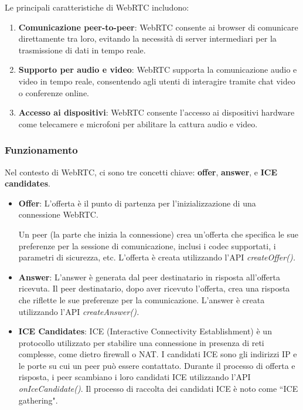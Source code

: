 Le principali caratteristiche di WebRTC includono:

\begin{enumerate}
    \item \textbf{Comunicazione peer-to-peer}: WebRTC consente ai browser di comunicare direttamente tra loro, evitando la necessità di server intermediari per la trasmissione di dati in tempo reale.

    \item \textbf{Supporto per audio e video}: WebRTC supporta la comunicazione audio e video in tempo reale, consentendo agli utenti di interagire tramite chat video o conferenze online.

    \item \textbf{Accesso ai dispositivi}: WebRTC consente l'accesso ai dispositivi hardware come telecamere e microfoni per abilitare la cattura audio e video.
\end{enumerate}

%
%
%
\subsubsection{Funzionamento}
Nel contesto di WebRTC, ci sono tre concetti chiave: \textbf{offer}, \textbf{answer}, e \textbf{ICE candidates}.

\begin{itemize}
    \item \textbf{Offer}:
    L'offerta è il punto di partenza per l'inizializzazione di una connessione WebRTC.

    Un peer (la parte che inizia la connessione) crea un'offerta che specifica le sue preferenze per la sessione di comunicazione, inclusi i codec supportati, i parametri di sicurezza, etc.
    L'offerta è creata utilizzando l'API \textit{createOffer().}

    \item \textbf{Answer}:
    L'answer è generata dal peer destinatario in risposta all'offerta ricevuta.
    Il peer destinatario, dopo aver ricevuto l'offerta, crea una risposta che riflette le sue preferenze per la comunicazione.
    L'answer è creata utilizzando l'API \textit{createAnswer().}

    \item \textbf{ICE Candidates}:
    ICE (Interactive Connectivity Establishment) è un protocollo utilizzato per stabilire una connessione in presenza di reti complesse, come dietro firewall o NAT.
    I candidati ICE sono gli indirizzi IP e le porte su cui un peer può essere contattato.
    Durante il processo di offerta e risposta, i peer scambiano i loro candidati ICE utilizzando l'API \textit{onIceCandidate()}.
    Il processo di raccolta dei candidati ICE è noto come “ICE gathering".
\end{itemize}

